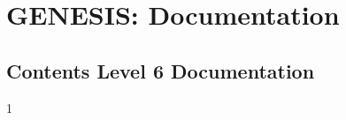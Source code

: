 \documentclass[12pt]{article}
\begin{document}
\section*{GENESIS: Documentation}

\subsection*{Contents Level 6 Documentation}

\begin{itemize}

1
\end{itemize}

\end{document}
